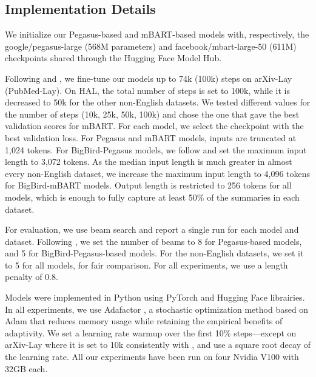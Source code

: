 
\subsection{Implementation Details}

We initialize our Pegasus-based and mBART-based models with, respectively, the google/pegasus-large (568M parameters) and facebook/mbart-large-50 (611M) checkpoints shared through the Hugging Face Model Hub. 

Following \citet{zhang2020pegasus} and \citet{zaheer2020big}, we fine-tune our models up to 74k (100k) steps on arXiv-Lay (PubMed-Lay). On HAL, the total number of steps is set to 100k, while it is decreased to 50k for the other non-English datasets. We tested different values for the number of steps (10k, 25k, 50k, 100k) and chose the one that gave the best validation scores for mBART.
For each model, we select the checkpoint with the best validation loss. For Pegasus and mBART models, inputs are truncated at 1,024 tokens. For BigBird-Pegasus models, we follow \citet{zaheer2020big} and set the maximum input length to 3,072 tokens. As the median input length is much greater in almost every non-English dataset, we increase the maximum input length to 4,096 tokens for BigBird-mBART models. Output length is restricted to 256 tokens for all models, which is enough to fully capture at least 50\% of the summaries in each dataset.

For evaluation, we use beam search and report a single run for each model and dataset. Following \citet{zhang2020pegasus, zaheer2020big}, we set the number of beams to 8 for Pegasus-based models, and 5 for BigBird-Pegasus-based models. For the non-English datasets, we set it to 5 for all models, for fair comparison. For all experiments, we use a length penalty of 0.8. 

Models were implemented in Python using PyTorch \citep{paszke2017automatic} and Hugging Face \citep{wolf2019huggingface} librairies. In all experiments, we use Adafactor \citep{shazeer2018adafactor}, a stochastic optimization method based on Adam \citep{kingma2014adam} that reduces memory usage while retaining the empirical benefits of adaptivity. We set a learning rate warmup over the first 10\% steps—except on arXiv-Lay where it is set to 10k consistently with \citet{zaheer2020big}, and use a square root decay of the learning rate. All our experiments have been run on four Nvidia V100 with 32GB each. 

